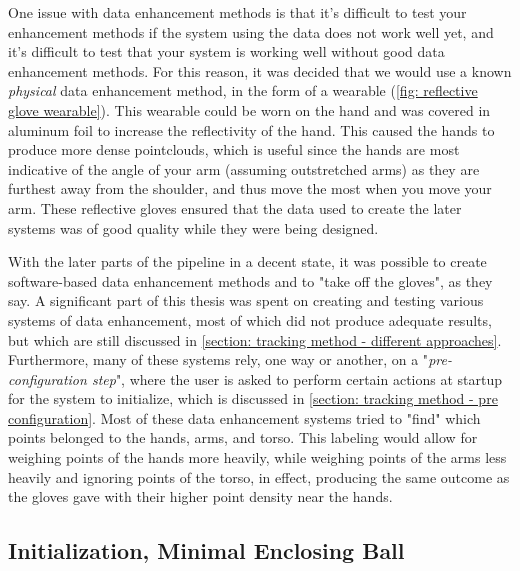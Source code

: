 One issue with data enhancement methods is that it's difficult to test your enhancement methods if the system using the data does not work well yet, and it's difficult to test that your system is working well without good data enhancement methods.
For this reason, it was decided that we would use a known \textit{physical} data enhancement method, in the form of a wearable (\cref{fig: reflective glove wearable}).
This wearable could be worn on the hand and was covered in aluminum foil to increase the reflectivity of the hand.
This caused the hands to produce more dense pointclouds, which is useful since the hands are most indicative of the angle of your arm (assuming outstretched arms) as they are furthest away from the shoulder, and thus move the most when you move your arm.
These reflective gloves ensured that the data used to create the later systems was of good quality while they were being designed.

With the later parts of the pipeline in a decent state, it was possible to create software-based data enhancement methods and to "take off the gloves", as they say.
A significant part of this thesis was spent on creating and testing various systems of data enhancement, most of which did not produce adequate results, but which are still discussed in \cref{section: tracking method - different approaches}. 
Furthermore, many of these systems rely, one way or another, on a "\textit{pre-configuration step}", where the user is asked to perform certain actions at startup for the system to initialize, which is discussed in \cref{section: tracking method - pre configuration}.
Most of these data enhancement systems tried to "find" which points belonged to the hands, arms, and torso.
This labeling would allow for weighing points of the hands more heavily, while weighing points of the arms less heavily and ignoring points of the torso, in effect, producing the same outcome as the gloves gave with their higher point density near the hands.

\subsection{Initialization, Minimal Enclosing Ball}
\label{sub-section: tracking method - data enhancement - minimal enclosing ball}

